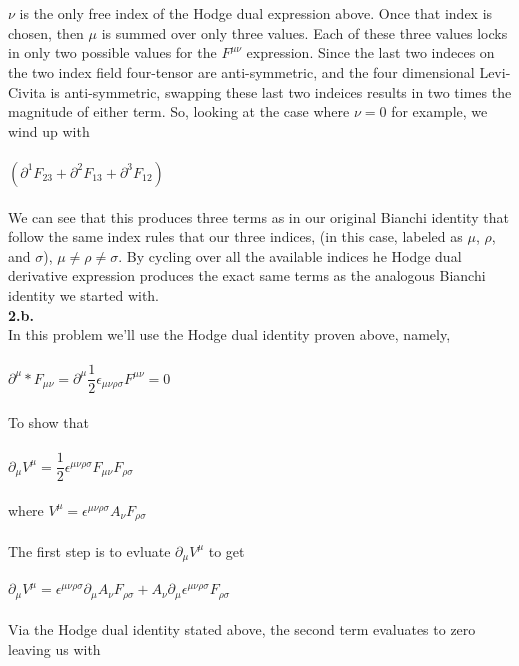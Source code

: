 \documentclass[prb,preprint]
{revtex4-1}
\newcommand{\PRLsep}{\noindent\makebox[\linewidth]{\resizebox{0.8888\linewidth}{2pt}{$\bullet$}}\bigskip}
\begin{document}
\\
\\
$\nu$ is the only free index of the Hodge dual expression above.  Once that index is chosen, then $\mu$ is summed over only three values.  Each of these three values locks in only two possible values for the $F^{\mu\nu}$ expression.  Since the last two indeces on the two index field four-tensor are anti-symmetric, and the four dimensional Levi-Civita is anti-symmetric, swapping these last two indeices results in two times the magnitude of either term.  So, looking at the case where $\nu = 0$ for example, we wind up with 
\\
\\
$\left(\partial^1 F_{23} + \partial^2 F_{13} +\partial^3 F_{12}\right)$
\\
\\
We can see that this produces three terms as in our original Bianchi identity that follow the same index rules that our three indices, (in this case, labeled as $\mu$, $\rho$, and $\sigma$), $\mu \neq \rho \neq \sigma$.  By cycling over all the available indices he Hodge dual derivative expression produces the exact same terms as the analogous Bianchi identity we started with.
\\
\PRLsep
\newpage
\textbf{2.b.}
\\
In this problem we'll use the Hodge dual identity proven above, namely, 
\\
\\
$\partial^\mu *F_{\mu\nu} = \partial^\mu \dfrac{1}{2}\epsilon_{\mu\nu\rho\sigma}F^{\mu\nu} = 0$
\\
\\
To show that 
\\
\\
$\partial_\mu V^\mu = \dfrac{1}{2}\epsilon^{\mu\nu\rho\sigma}F_{\mu\nu}F_{\rho\sigma}$
\\
\\
where $V^\mu = \epsilon^{\mu\nu\rho\sigma}A_\nu F_{\rho\sigma}$
\\
\\
The first step is to evluate $\partial_\mu V^\mu$ to get
\\
\\
$\partial_\mu V^\mu = \epsilon^{\mu\nu\rho\sigma}\partial_\mu A_\nu F_{\rho\sigma} + A_\nu \partial_\mu\epsilon^{\mu\nu\rho\sigma} F_{\rho\sigma}$
\\
\\
Via the Hodge dual identity stated above, the second term evaluates to zero leaving us with 
\\
\end{document}
